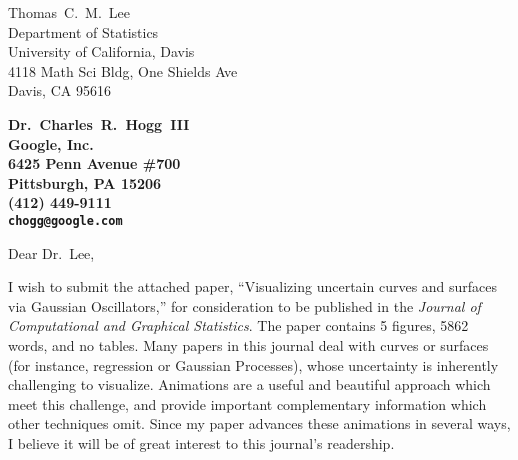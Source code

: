 \documentclass[11pt]{letter} %
\begin{document}

\begin{letter}{%
    Thomas~C.~M.~Lee \\
    Department of Statistics \\
    University of California, Davis  \\
    4118 Math Sci Bldg, One Shields Ave  \\
    Davis, CA 95616
}


\begin{center}
\large\bf Dr.~Charles~R.~Hogg~III \\ %
Google, Inc. \\ 6425 Penn Avenue \#700 \\ Pittsburgh, PA 15206 \\ (412) 449-9111 %
\\ \texttt{chogg@google.com}
\end{center} 
\vfill

\signature{Charles~R.~Hogg~III} %


\opening{Dear Dr.~Lee,} 

I wish to submit the attached paper, ``Visualizing uncertain curves and surfaces via Gaussian Oscillators,'' for consideration to be published in the \textit{Journal of Computational and Graphical Statistics}.
The paper contains 5 figures, 5862 words, and no tables.
Many papers in this journal deal with curves or surfaces (for instance, regression or Gaussian Processes), whose uncertainty is inherently challenging to visualize.
Animations are a useful and beautiful approach which meet this challenge, and provide important complementary information which other techniques omit.
Since my paper advances these animations in several ways, I believe it will be of great interest to this journal's readership.


\end{letter}
\end{document}
